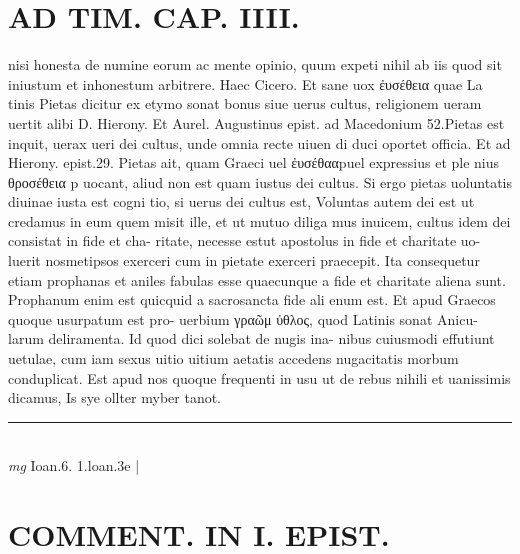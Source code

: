 \documentclass{article}
\begin{document}
\begin{pages}
\section*{AD TIM. CAP. IIII. }
\marginpar{[ p.142 ]}\pstart nisi honesta de numine eorum ac mente opinio, quum expeti nihil ab iis quod sit iniustum et inhonestum arbitrere. Haec Cicero. Et sane uox ἐυσέθεια quae La tinis Pietas dicitur ex etymo sonat bonus siue uerus cultus, religionem ueram uertit alibi D. Hierony. Et Aurel. Augustinus epist. ad Macedonium 52.Pietas est inquit, uerax ueri dei cultus, unde omnia recte uiuen di duci oportet officia. Et ad Hierony. epist.29. Pietas ait, quam Graeci uel ἐυσέθααpuel expressius et ple nius θροσέθεια p uocant, aliud non est quam iustus dei cultus. Si ergo pietas uoluntatis diuinae iusta est cogni tio, si uerus dei cultus est, Voluntas autem dei est ut credamus in eum quem misit ille, et ut mutuo diliga mus inuicem, cultus idem dei consistat in fide et cha- ritate, necesse estut apostolus in fide et charitate uo- luerit nosmetipsos exerceri cum in pietate exerceri praecepit. Ita consequetur etiam prophanas et aniles fabulas esse quaecunque a fide et charitate aliena sunt. Prophanum enim est quicquid a sacrosancta fide ali enum est. Et apud Graecos quoque usurpatum est pro- uerbium γραῶμ ὐθλος, quod Latinis sonat Anicu- larum deliramenta. Id quod dici solebat de nugis ina- nibus cuiusmodi effutiunt uetulae, cum iam sexus uitio uitium aetatis accedens nugacitatis morbum conduplicat. Est apud nos quoque frequenti in usu ut de rebus nihili et uanissimis dicamus, Is sye ollter myber tanot.  \pend
\vspace{0.5cm}\noindent
\vspace{0.2cm}\rule{1cm}{0.2pt}\\ 
\hspace{0.2cm}\textit{mg}
\footnotesize Ioan.6. 1.loan.3e 
\normalsize| 
\section*{COMMENT. IN I. EPIST. }
{}

\end{pages}
\end{document}
